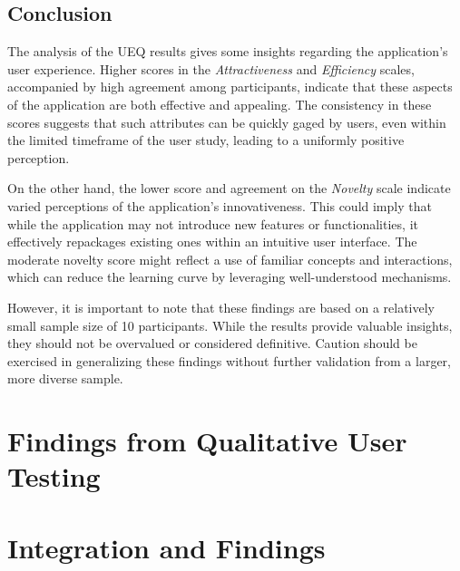 \subsection*{Conclusion}

The analysis of the UEQ results gives some insights regarding the application's user experience. 
Higher scores in the \emph{Attractiveness} and \emph{Efficiency} scales, accompanied by high agreement among participants, indicate that these aspects of the application are both effective and appealing. 
The consistency in these scores suggests that such attributes can be quickly gaged by users, even within the limited timeframe of the user study, leading to a uniformly positive perception.

On the other hand, the lower score and agreement on the \emph{Novelty} scale indicate varied perceptions of the application’s innovativeness. 
This could imply that while the application may not introduce new features or functionalities, it effectively repackages existing ones within an intuitive user interface. 
The moderate novelty score might reflect a use of familiar concepts and interactions, which can reduce the learning curve by leveraging well-understood mechanisms.

However, it is important to note that these findings are based on a relatively small sample size of 10 participants. 
While the results provide valuable insights, they should not be overvalued or considered definitive. 
Caution should be exercised in generalizing these findings without further validation from a larger, more diverse sample.

\section{Findings from Qualitative User Testing}
\label{sec:result:testing}


\section{Integration and Findings}
\label{sec:result:findings}

